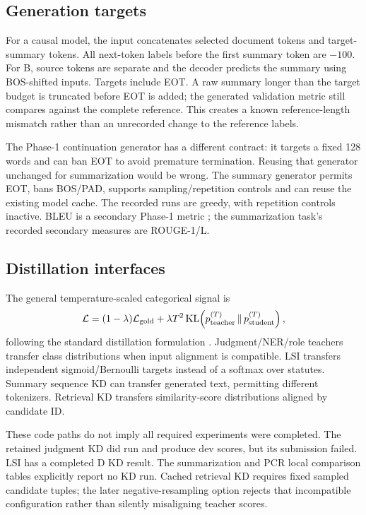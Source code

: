 \subsection{Generation targets}
For a causal model, the input concatenates selected document tokens and target-summary tokens.
All next-token labels before the first summary token are $-100$. For B, source tokens are separate and
the decoder predicts the summary using BOS-shifted inputs. Targets include EOT. A raw summary longer
than the target budget is truncated before EOT is added; the generated validation metric still compares
against the complete reference. This creates a known reference-length mismatch rather than an unrecorded
change to the reference labels.

The Phase-1 continuation generator has a different contract: it targets a fixed 128 words and can ban
EOT to avoid premature termination. Reusing that generator unchanged for summarization would be wrong.
The summary generator permits EOT, bans BOS/PAD, supports sampling/repetition controls and can reuse
the existing model cache. The recorded runs are greedy, with repetition controls inactive. BLEU is a
secondary Phase-1 metric \cite{bleu}; the summarization task's recorded secondary measures are ROUGE-1/L.

\subsection{Distillation interfaces}
The general temperature-scaled categorical signal is
\[
\mathcal L=(1-\lambda)\mathcal L_{\rm gold}
 +\lambda T^2\operatorname{KL}\!\left(p_{\rm teacher}^{(T)}\,\|\,p_{\rm student}^{(T)}\right),
\]
following the standard distillation formulation \cite{distillation}. Judgment/NER/role teachers transfer
class distributions when input alignment is compatible. LSI transfers independent sigmoid/Bernoulli
targets instead of a softmax over statutes. Summary sequence KD can transfer generated text, permitting
different tokenizers. Retrieval KD transfers similarity-score distributions aligned by candidate ID.

These code paths do not imply all required experiments were completed. The retained judgment KD did run
and produce dev scores, but its submission failed. LSI has a completed D KD result. The summarization
and PCR local comparison tables explicitly report no KD run. Cached retrieval KD requires fixed sampled
candidate tuples; the later negative-resampling option rejects that incompatible configuration rather
than silently misaligning teacher scores.

